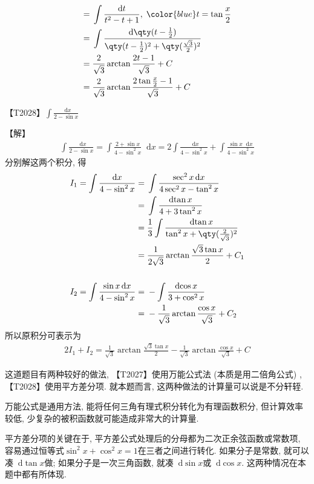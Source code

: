 \documentclass{ctexbook}
\newcommand*{\dif}{\mathop{}\!\mathrm{d}}
\begin{document}
{\begin{align*}
={}&\int\frac{\dif{t}}{t^{2}-t+1},\;{\color{blue}t=\tan{\frac{x}{2}}}\\
={}&\int\frac{\dif{\qty(t-\frac{1}{2})}}{\qty(t-\frac{1}{2})^{2}+\qty(\frac{\sqrt{3}}{2})^{2}}\\
={}&\frac{2}{\sqrt{3}}\arctan{\frac{2t-1}{\sqrt{3}}}+C\\
={}&\frac{2}{\sqrt{3}}\arctan{\frac{2\tan{\frac{x}{2}}-1}{\sqrt{3}}}+C
\end{align*}\par
{\color{red}【T2028】}$\int\frac{\dif{x}}{2-\sin{x}}$\par
【解】
\begin{align*}
\int\frac{\dif{x}}{2-\sin{x}}=\int\frac{2+\sin{x}}{4-\sin^{2}{x}}\dif{x}=2\int\frac{\dif{x}}{4-\sin^{2}{x}}+\int\frac{\sin{x}\dif{x}}{4-\sin^{2}{x}}
\end{align*}
分别解这两个积分, 得
\begin{align*}
I_{1}=\int\frac{\dif{x}}{4-\sin^{2}{x}}={}&\int\frac{\sec^{2}{x}\dif{x}}{4\sec^{2}{x}-\tan^{2}{x}}\\
={}&\int\frac{\dif{\tan{x}}}{4+3\tan^{2}{x}}\\
={}&\frac{1}{3}\int\frac{\dif{\tan{x}}}{\tan^{2}{x}+\qty(\frac{2}{\sqrt{3}})^{2}}\\
={}&\frac{1}{2\sqrt{3}}\arctan{\frac{\sqrt{3}\tan{x}}{2}}+C_{1}\\
\\
I_{2}=\int\frac{\sin{x}\dif{x}}{4-\sin^{2}{x}}={}&-\int\frac{\dif{\cos{x}}}{3+\cos^{2}{x}}\\
={}&-\frac{1}{\sqrt{3}}\arctan{\frac{\cos{x}}{\sqrt{3}}}+C_{2}
\end{align*}
所以原积分可表示为
\begin{align*}
2I_{1}+I_{2}=\frac{1}{\sqrt{3}}\arctan{\frac{\sqrt{3}\tan{x}}{2}}-\frac{1}{\sqrt{3}}\arctan{\frac{\cos{x}}{\sqrt{3}}}+C
\end{align*}\par
{\kaishu 这道题目有两种较好的做法, {\color{red}【T2027】}使用万能公式法 (本质是用二倍角公式) , {\color{red}【T2028】}使用平方差分项. 就本题而言, 这两种做法的计算量可以说是不分轩轾. \par
万能公式是通用方法, 能将任何三角有理式积分转化为有理函数积分, 但计算效率较低, 少复杂的被积函数就可能造成非常大的计算量. \par
平方差分项的关键在于, 平方差公式处理后的分母都为二次正余弦函数或常数项, 容易通过恒等式$\sin^{2}{x}+\cos^{2}{x}=1$在三者之间进行转化. 如果分子是常数, 就可以凑$\dif{\tan{x}}$做; 如果分子是一次三角函数, 就凑$\dif{\sin{x}}$或$\dif{\cos{x}}$. 这两种情况在本题中都有所体现. \par}
}
\end{document}
